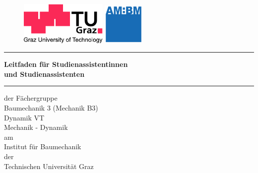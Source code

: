 %
%
\begin{titlepage}
        \begin{figure}[htbp]
        \hspace{.05\linewidth}
            \begin{minipage}[b]{.6\linewidth}
                \includegraphics[width=4.2cm]{coverPics/logo_lang_V8.pdf}
            \end{minipage}
            \hspace{.2\linewidth}
        \begin{minipage}[b]{.2\linewidth}
                \includegraphics[width=2cm]{coverPics/AM_BM.pdf}
        \end{minipage}
        \end{figure}

        \vspace*{3mm}
    \hrule

    \fontsize{16pt}{24pt}\selectfont


\begin{center}
    \vspace{30mm}
        \textsf{\textbf{Leitfaden f\"{u}r Studienassistentinnen\\
          und Studienassistenten}}
    \normalfont

    \vspace{10mm}
        \hrule
    \vspace{10mm}
    \normalsize{der F\"{a}chergruppe}\\
    \vspace{5mm}
    \Large{Baumechanik 3 (Mechanik B3)}\\
    \Large{Dynamik VT}\\
    \Large{Mechanik - Dynamik}\\ 
    \vspace{5mm}
    \normalsize{am}\\
    \vspace{5mm}
    \Large{Institut f\"{u}r Baumechanik \\ der 
          \\ Technischen Universit\"{a}t Graz} \\


\end{center}
\end{titlepage}
